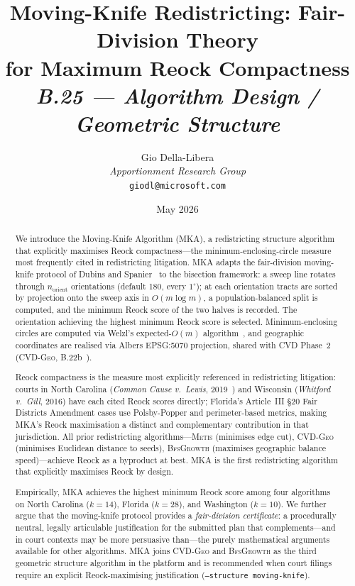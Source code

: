 \documentclass[12pt]{article}
\title{%
  \textbf{Moving-Knife Redistricting: Fair-Division Theory}\\
  \textbf{for Maximum Reock Compactness}\\[0.8em]
  \normalsize\textit{B.25 --- Algorithm Design / Geometric Structure}%
}
\author{%
  Gio Della-Libera\\
  \textit{Apportionment Research Group}\\
  \small\texttt{giodl@microsoft.com}
}
\date{May 2026}
\newcommand{\mka}{\textsc{MKA}}
\newcommand{\cvdgeo}{\textsc{CVD-Geo}}
\newcommand{\bfsg}{\textsc{BfsGrowth}}
\newcommand{\metis}{\textsc{Metis}}
\begin{document}
\maketitle

\begin{abstract}
\noindent
We introduce the Moving-Knife Algorithm (\mka{}), a redistricting structure
algorithm that explicitly maximises Reock compactness---the minimum-enclosing-circle
measure most frequently cited in redistricting litigation.
\mka{} adapts the fair-division moving-knife protocol of Dubins and
Spanier~\citeyear{dubins1961} to the bisection framework: a sweep line rotates
through $n_{\mathrm{orient}}$ orientations (default 180, every $1^\circ$); at each
orientation tracts are sorted by projection onto the sweep axis in $O(m \log m)$,
a population-balanced split is computed, and the minimum Reock score of the two
halves is recorded.
The orientation achieving the highest minimum Reock score is selected.
Minimum-enclosing circles are computed via Welzl's expected-$O(m)$
algorithm~\citep{welzl1991}, and geographic coordinates are realised via Albers
EPSG:5070 projection, shared with CVD Phase~2 (\cvdgeo{},
B.22b~\citep{dellaLibera2026cvdgeo}).

Reock compactness is the measure most explicitly referenced in redistricting
litigation: courts in North Carolina (\textit{Common Cause v.\ Lewis},
2019~\citep{common_cause_lewis}) and Wisconsin (\textit{Whitford v.\ Gill}, 2016)
have each cited Reock scores directly; Florida's Article~III \S20 Fair Districts
Amendment cases use Polsby-Popper and perimeter-based metrics, making \mka{}'s
Reock maximisation a distinct and complementary contribution in that jurisdiction.
All prior redistricting algorithms---\metis{} (minimises edge cut),
\cvdgeo{} (minimises Euclidean distance to seeds), \bfsg{} (maximises geographic
balance speed)---achieve Reock as a byproduct at best.
\mka{} is the first redistricting algorithm that explicitly maximises Reock
by design.

Empirically, \mka{} achieves the highest minimum Reock score among four
algorithms on North Carolina ($k=14$), Florida ($k=28$), and Washington ($k=10$).
We further argue that the moving-knife protocol provides a
\emph{fair-division certificate}: a procedurally neutral, legally articulable
justification for the submitted plan that complements---and in court contexts may
be more persuasive than---the purely mathematical arguments available for other
algorithms.
\mka{} joins \cvdgeo{} and \bfsg{} as the third geometric structure algorithm
in the platform and is recommended when court filings require an explicit
Reock-maximising justification (\texttt{--structure moving-knife}).
\end{abstract}

\tableofcontents
\newpage










\end{document}
